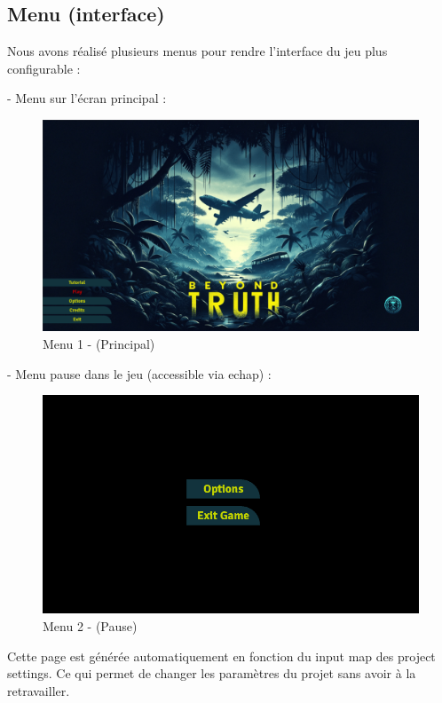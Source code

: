 \documentclass[
	article,			%
	11pt,				%
	oneside,			%
	a4paper,			%
	chapter=TITLE,
	french,			%
	sumario=tradicional
	]{base_nt}
\begin{document}
\newpage

\subsection{Menu (interface)}

Nous avons réalisé plusieurs menus pour rendre l'interface du jeu plus configurable :

- Menu sur l'écran principal :

\begin{figure}[ht]
	\caption{Menu 1 - (Principal)}
	\centering
	\includegraphics[width=0.85\linewidth]{paper30.png}
	\legend{}
	
\end{figure}

- Menu pause dans le jeu (accessible via echap) :

\begin{figure}[ht]
	\caption{Menu 2 - (Pause)}
	\centering
	\includegraphics[width=0.85\linewidth]{paper33.png}
	\legend{}
	
\end{figure}

\newpage

Cette page est générée automatiquement en fonction du input map des project settings. Ce qui permet de changer les paramètres du projet sans avoir à la retravailler.
\end{document}
